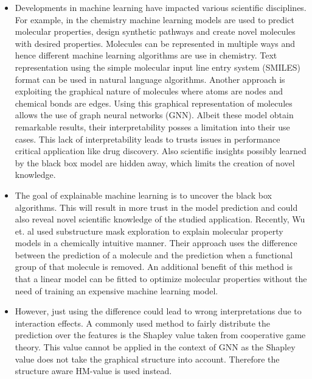 \documentclass[twoside,twocolumn,9pt]{article}
\begin{document}
\begin{itemize}

    \item Developments in machine learning have impacted various scientific disciplines. For example, 
        in the chemistry machine learning models are used to predict molecular properties\cite{}, 
        design synthetic pathways\cite{} and create novel molecules with desired properties\cite{}.
        Molecules can be represented in multiple ways and hence different machine learning 
        algorithms are use in chemistry. Text representation using the simple molecular 
        input line entry system (SMILES)\cite{} format can be used in natural language algorithms\cite{}.
        Another approach is exploiting the graphical nature of molecules where atoms are 
        nodes and chemical bonds are edges.\cite{} Using this graphical representation of molecules 
        allows the use of graph neural networks (GNN)\cite{}. Albeit these model obtain remarkable 
        results\cite{}, their interpretability posses a limitation into their use cases.\cite{}
        This lack of interpretability leads to trusts issues in performance critical application 
        like drug discovery.\cite{} Also scientific insights possibly learned by the black box 
        model are hidden away, which limits the creation of novel knowledge.\cite{}

	\item The goal of explainable machine learning is to uncover the black box algorithms.\cite{}
	      This will result in more trust in the model prediction and could also reveal
	      novel scientific knowledge of the studied application.\cite{} Recently, Wu et. al used
	      substructure mask exploration to explain molecular property models in a chemically
	      intuitive manner.\cite{} Their approach uses the difference between the prediction
	      of a molecule and the prediction when a functional group of that molecule is removed.
	      An additional benefit of this method is that a linear model can be fitted to optimize
	      molecular properties without the need of training an expensive machine learning model. \\

	\item However, just using the difference could lead to wrong interpretations due to interaction
	      effects.\cite{} A commonly used method to fairly distribute the prediction over the
	      features is the Shapley value taken from cooperative game theory.\cite{} This value cannot
	      be applied in the context of GNN as the Shapley value does not take the graphical structure
	      into account. Therefore the structure aware HM-value is used instead.\cite{}
\end{itemize}
\end{document}

